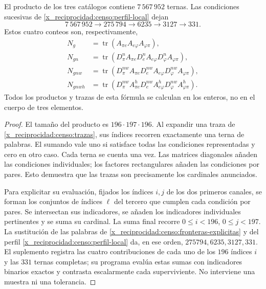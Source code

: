 \begin{theorem}
\label{x_reciprocidad:censo:teorema-conteo}
El producto de los tres catálogos contiene \(7\,567\,952\) ternas.
Las condiciones sucesivas de \eqref{x_reciprocidad:censo:perfil-local} dejan
\begin{equation}
 7\,567\,952\longrightarrow275\,794\longrightarrow6235
 \longrightarrow3127\longrightarrow331.
 \label{x_reciprocidad:censo:cadena-local}
\end{equation}
Estos cuatro conteos son, respectivamente,
\begin{align}
 N_g&=\operatorname{tr}(A_{\pi e}A_{e\varphi}A_{\varphi\pi}),
 \nonumber\\
 N_{gn}&=\operatorname{tr}(D_\pi^n A_{\pi e}
             D_e^n A_{e\varphi}D_\varphi^n A_{\varphi\pi}),
 \nonumber\\
 N_{gnw}&=\operatorname{tr}(D_\pi^{nw} A_{\pi e}
             D_e^{nw} A_{e\varphi}D_\varphi^{nw} A_{\varphi\pi}),
 \nonumber\\
 N_{gnwh}&=\operatorname{tr}(D_\pi^{nw} A^h_{\pi e}
             D_e^{nw} A^h_{e\varphi}D_\varphi^{nw} A^h_{\varphi\pi}).
 \label{x_reciprocidad:censo:trazas}
\end{align}
Todos los productos y trazas de esta fórmula se calculan en los enteros,
no en el cuerpo de tres elementos.
\end{theorem}
\begin{proof}
El tamaño del producto es \(196\cdot197\cdot196\). Al expandir
una traza de \eqref{x_reciprocidad:censo:trazas}, sus índices recorren exactamente una
terna de palabras. El sumando vale uno si satisface todas las condiciones
representadas y cero en otro caso. Cada terna se cuenta una vez.
Las matrices diagonales añaden las condiciones individuales; los factores
rectangulares añaden las condiciones por pares. Esto demuestra que las
trazas son precisamente los cardinales anunciados.

Para explicitar su evaluación, fijados los índices \(i,j\) de los dos
primeros canales, se forman los conjuntos de índices \(\ell\) del tercero
que cumplen cada condición por pares. Se intersectan sus indicadores,
se añaden los indicadores individuales pertinentes y se suma su cardinal.
La suma final recorre \(0\leq i<196\), \(0\leq j<197\).
La sustitución de las palabras de \eqref{x_reciprocidad:censo:fronteras-explicitas} y
del perfil \eqref{x_reciprocidad:censo:perfil-local} da, en ese orden,
\(275794,6235,3127,331\). El suplemento registra las cuatro contribuciones
de cada uno de los \(196\) índices \(i\) y las \(331\) ternas completas;
su programa evalúa estas sumas con indicadores binarios exactos y contrasta
escalarmente cada superviviente. No interviene una muestra ni una tolerancia.
\end{proof}

